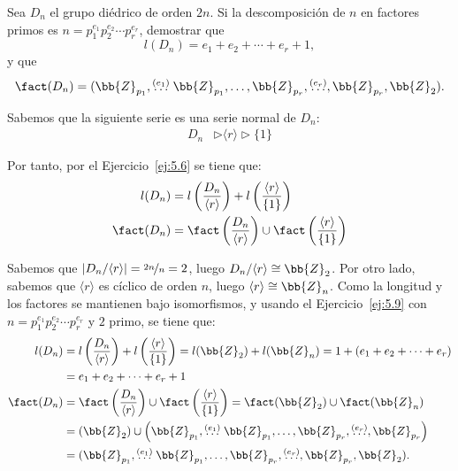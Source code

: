 \begin{ejercicio}
    Sea $D_n$ el grupo diédrico de orden $2n$. Si la descomposición de $n$ en factores primos es $n = p_1^{e_1} p_2^{e_2} \cdots p_r^{e_r}$, demostrar que
    \[
        l(D_n) = e_1 + e_2 + \cdots + e_r + 1,
    \]
    y que
    \[
        \fact(D_n) = (\bb{Z}_{p_1}, \stackrel{(e_1)}{\ldots}\bb{Z}_{p_1}, \dots, \bb{Z}_{p_r},\stackrel{(e_r)}{\ldots}, \bb{Z}_{p_r}, \bb{Z}_2).
    \]

    Sabemos que la siguiente serie es una serie normal de $D_n$:
    \begin{align*}
        D_n &\rhd \langle r \rangle \rhd \{1\}
    \end{align*}

    Por tanto, por el Ejercicio~\ref{ej:5.6} se tiene que:
    \begin{align*}
        l(D_n) &= l\left(\dfrac{D_n}{\langle r \rangle}\right) + l\left(\dfrac{\langle r \rangle}{\{1\}}\right) \\
        \fact(D_n) &= \fact\left(\dfrac{D_n}{\langle r \rangle}\right) \cup \fact\left(\dfrac{\langle r \rangle}{\{1\}}\right)
    \end{align*}

    Sabemos que $|D_n/\langle r \rangle|=\nicefrac{2n}{n}=2$, luego $D_n/\langle r \rangle \cong \bb{Z}_2$. Por otro lado, sabemos que $\langle r \rangle$ es cíclico de orden $n$, luego $\langle r \rangle \cong \bb{Z}_n$. Como la longitud y los factores se mantienen bajo isomorfismos, y usando el Ejercicio~\ref{ej:5.9} con $n = p_1^{e_1} p_2^{e_2} \cdots p_r^{e_r}$ y $2$ primo, se tiene que:
    \begin{align*}
        l(D_n) &= l\left(\dfrac{D_n}{\langle r \rangle}\right) + l\left(\dfrac{\langle r \rangle}{\{1\}}\right) 
        = l(\bb{Z}_2) + l(\bb{Z}_n) 
        = 1 + \left(e_1 + e_2 + \cdots + e_r\right) \\
        &= e_1 + e_2 + \cdots + e_r + 1\\
        \fact(D_n) &= \fact\left(\dfrac{D_n}{\langle r \rangle}\right) \cup \fact\left(\dfrac{\langle r \rangle}{\{1\}}\right)
        = \fact(\bb{Z}_2) \cup \fact(\bb{Z}_n) \\
        &= (\bb{Z}_2) \cup \left(\bb{Z}_{p_1}, \stackrel{(e_1)}{\ldots}\bb{Z}_{p_1}, \dots, \bb{Z}_{p_r},\stackrel{(e_r)}{\ldots}, \bb{Z}_{p_r}\right)\\
        &= (\bb{Z}_{p_1}, \stackrel{(e_1)}{\ldots}\bb{Z}_{p_1}, \dots, \bb{Z}_{p_r},\stackrel{(e_r)}{\ldots}, \bb{Z}_{p_r}, \bb{Z}_2).
    \end{align*}
\end{ejercicio}

